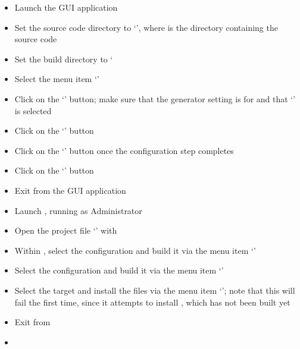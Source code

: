 \begin{itemize}
\item Launch the  GUI application
\item\exSp{} Set the source code directory to `',
where  is the directory containing the \mplusm{} source code
\item\exSp{} Set the build directory to `
\item\exSp{} Select the menu item `'
\item\exSp{} Click on the `' button; make sure that the generator
setting is for  and that `' is
selected
\item\exSp{} Click on the `' button
\item\exSp{} Click on the `' button once the configuration step
completes
\item\exSp{} Click on the `' button
\item\exSp{} Exit from the  GUI application
\item\exSp{} Launch , running as Administrator
\item\exSp{} Open the project file
`' with
\item\exSp{} Within , select the  configuration and
build it via the menu item `'
\item\exSp{} Select the  configuration and build it via the menu item
`'
\item\exSp{} Select the  target and install the  files via
the menu item `'; note that this will fail the first time, since it attempts to install
\textit{\CMU}, which has not been built yet
\item\exSp{} Exit from 
\end{itemize}
\tertiaryEnd
{}
\begin{itemize}
\item\TBD
\end{itemize}
\tertiaryEnd
